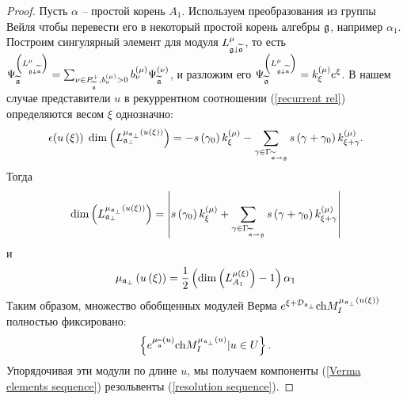 \begin{proof}
Пусть $\alpha $ -- простой корень  $A_{1}$. Используем преобразования из группы Вейля чтобы перевести его в некоторый простой корень алгебры $\frak{g}$, например $\alpha _{1}$. Построим сингулярный элемент для модуля  $L_{\frak{g}\downarrow
\widetilde{\frak{a}}}^{\mu }$, то есть  $\Psi _{\widetilde{\frak{a}}%
}^{\left( L_{\frak{g}\downarrow \widetilde{\frak{a}}}^{\mu }\right)
}=\sum_{\nu \in P_{\widetilde{\frak{a}}}^{+},b_{\nu }^{\left( \mu \right)
}>0}b_{\nu }^{\left( \mu \right) }\Psi _{\widetilde{\frak{a}}}^{\left( \nu
\right) }$, и разложим его $\Psi _{\widetilde{\frak{a}}}^{\left( L_{\frak{%
g}\downarrow \widetilde{\frak{a}}}^{\mu }\right) }=k_{\xi }^{\left( \mu
\right) }e^{\xi }$. В нашем случае представители $u$ в рекуррентном соотношении (\ref{recurrent rel}) определяются весом $\xi $ однозначно:
\begin{equation*}
\epsilon (u\left( \xi \right) )\;\dim \left( L_{\frak{a}_{\perp }}^{\mu _{%
\frak{a}_{\perp }}\left( u\left( \xi \right) \right) }\right) =-s\left(
\gamma _{0}\right) k_{\xi }^{\left( \mu \right) }-\sum_{\gamma \in \Gamma _{%
\widetilde{\frak{a}}\rightarrow \frak{g}}}s\left( \gamma +\gamma _{0}\right)
k_{\xi +\gamma }^{\left( \mu \right) }.
\end{equation*}
Тогда
\begin{equation*}
\dim \left( L_{\frak{a}_{\perp }}^{\mu _{\frak{a}_{\perp }}\left( u\left(
\xi \right) \right) }\right) =\left| s\left( \gamma _{0}\right) k_{\xi
}^{\left( \mu \right) }+\sum_{\gamma \in \Gamma _{\widetilde{\frak{a}}%
\rightarrow \frak{g}}}s\left( \gamma +\gamma _{0}\right) k_{\xi +\gamma
}^{\left( \mu \right) }\right|
\end{equation*}
и
\begin{equation*}
\mu _{\frak{a}_{\perp }}\left( u\left( \xi \right) \right) =\frac{1}{2}%
\left( \dim \left( L_{A_{1}}^{\mu \left( \xi \right) }\right) -1\right)
\alpha _{1}
\end{equation*}
Таким образом, множество обобщенных модулей Верма  $e^{\xi +\mathcal{D}%
_{\frak{a}_{\perp }}}\mathrm{ch}M_{I}^{\mu _{\frak{a}_{\perp }}\left(
u\left( \xi \right) \right) }$ полностью фиксировано:
\begin{equation*}
\left\{ e^{\mu _{\widetilde{\mathfrak{a}}}\left( u\right) }\mathrm{ch}%
M_{I}^{\mu _{\frak{a}_{\perp }}\left( u\right) }|u\in U\right\} .
\end{equation*}
Упорядочивая эти модули по длине $u$, мы получаем компоненты (\ref{Verma elements sequence}) резольвенты (\ref{resolution sequence}).
\end{proof}



